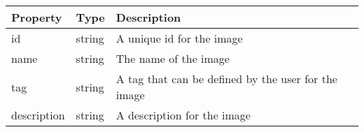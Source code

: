 \documentclass[9pt,]{article}
\begin{document}
\begin{longtable}[]{@{}lll@{}}
\toprule
\begin{minipage}[b]{0.17\columnwidth}\raggedright
Property\strut
\end{minipage} & \begin{minipage}[b]{0.14\columnwidth}\raggedright
Type\strut
\end{minipage} & \begin{minipage}[b]{0.58\columnwidth}\raggedright
Description\strut
\end{minipage}\tabularnewline
\midrule
\endhead
\begin{minipage}[t]{0.17\columnwidth}\raggedright
id\strut
\end{minipage} & \begin{minipage}[t]{0.14\columnwidth}\raggedright
string\strut
\end{minipage} & \begin{minipage}[t]{0.58\columnwidth}\raggedright
A unique id for the image\strut
\end{minipage}\tabularnewline
\begin{minipage}[t]{0.17\columnwidth}\raggedright
name\strut
\end{minipage} & \begin{minipage}[t]{0.14\columnwidth}\raggedright
string\strut
\end{minipage} & \begin{minipage}[t]{0.58\columnwidth}\raggedright
The name of the image\strut
\end{minipage}\tabularnewline
\begin{minipage}[t]{0.17\columnwidth}\raggedright
tag\strut
\end{minipage} & \begin{minipage}[t]{0.14\columnwidth}\raggedright
string\strut
\end{minipage} & \begin{minipage}[t]{0.58\columnwidth}\raggedright
A tag that can be defined by the user for the image\strut
\end{minipage}\tabularnewline
\begin{minipage}[t]{0.17\columnwidth}\raggedright
description\strut
\end{minipage} & \begin{minipage}[t]{0.14\columnwidth}\raggedright
string\strut
\end{minipage} & \begin{minipage}[t]{0.58\columnwidth}\raggedright
A description for the image\strut
\end{minipage}\tabularnewline

\end{longtable}
\end{document}

